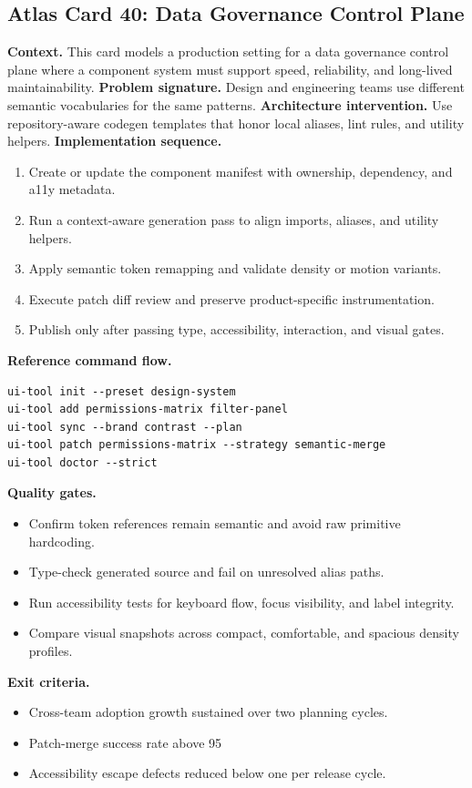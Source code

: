 \subsection*{Atlas Card 40: Data Governance Control Plane}
\textbf{Context.} This card models a production setting for a data governance control plane where a component system must support speed, reliability, and long-lived maintainability.
\textbf{Problem signature.} Design and engineering teams use different semantic vocabularies for the same patterns.
\textbf{Architecture intervention.} Use repository-aware codegen templates that honor local aliases, lint rules, and utility helpers.
\textbf{Implementation sequence.}
\begin{enumerate}[leftmargin=*, itemsep=0.28em]
  \item Create or update the component manifest with ownership, dependency, and a11y metadata.
  \item Run a context-aware generation pass to align imports, aliases, and utility helpers.
  \item Apply semantic token remapping and validate density or motion variants.
  \item Execute patch diff review and preserve product-specific instrumentation.
  \item Publish only after passing type, accessibility, interaction, and visual gates.
\end{enumerate}
\textbf{Reference command flow.}
\begin{verbatim}
ui-tool init --preset design-system
ui-tool add permissions-matrix filter-panel
ui-tool sync --brand contrast --plan
ui-tool patch permissions-matrix --strategy semantic-merge
ui-tool doctor --strict
\end{verbatim}
\textbf{Quality gates.}
\begin{itemize}[leftmargin=*, itemsep=0.24em]
  \item Confirm token references remain semantic and avoid raw primitive hardcoding.
  \item Type-check generated source and fail on unresolved alias paths.
  \item Run accessibility tests for keyboard flow, focus visibility, and label integrity.
  \item Compare visual snapshots across compact, comfortable, and spacious density profiles.
\end{itemize}
\textbf{Exit criteria.}
\begin{itemize}[leftmargin=*, itemsep=0.24em]
  \item Cross-team adoption growth sustained over two planning cycles.
  \item Patch-merge success rate above 95%
  \item Accessibility escape defects reduced below one per release cycle.
\end{itemize}
\clearpage

